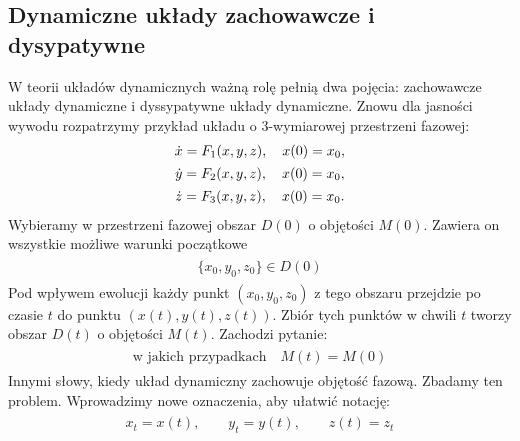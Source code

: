 \documentclass[a4paper,12pt,polish]{sphinxmanual}
\begin{document}
\subsection{Dynamiczne układy zachowawcze i dysypatywne}
\label{ch1/chI022:id1}
W teorii układów dynamicznych ważną rolę pełnią dwa pojęcia: zachowawcze układy dynamiczne i dyssypatywne układy dynamiczne.  Znowu dla jasności wywodu rozpatrzymy przykład układu o 3-wymiarowej przestrzeni fazowej:
\label{ch1/chI022:equation-eqn19}\begin{gather}
\begin{split}\dot x = F_1(x, y, z), \quad x(0) = x_0,\end{split}\label{ch1/chI022-eqn19}\\\begin{split}\dot y = F_2(x, y, z),  \quad x(0) = x_0,\end{split}\notag\\\begin{split}\dot z = F_3(x, y, z),  \quad x(0) = x_0.\end{split}\notag
\end{gather}
Wybieramy w przestrzeni fazowej obszar $D(0)$  o objętości $M(0)$. Zawiera on wszystkie możliwe warunki początkowe
\label{ch1/chI022:equation-eqn20}\begin{gather}
\begin{split}\{x_0, y_0, z_0\} \in D(0)\end{split}\label{ch1/chI022-eqn20}
\end{gather}
Pod wpływem ewolucji każdy punkt $(x_0, y_0, z_0)$  z tego obszaru przejdzie po czasie $t$ do punktu $(x(t),  y(t), z(t))$.  Zbiór tych punktów w chwili $t$ tworzy obszar  $D(t)$  o objętości $M(t)$. Zachodzi pytanie:
\label{ch1/chI022:equation-eqn21}\begin{gather}
\begin{split} \mbox{w jakich przypadkach} \quad M(t) = M(0)\end{split}\label{ch1/chI022-eqn21}
\end{gather}
Innymi słowy, kiedy układ dynamiczny zachowuje objętość fazową. Zbadamy ten problem. Wprowadzimy nowe oznaczenia, aby ułatwić notację:
\label{ch1/chI022:equation-eqn22}\begin{gather}
\begin{split}x_t = x(t), \qquad y_t = y(t), \qquad z(t) = z_t\end{split}\label{ch1/chI022-eqn22}
\end{gather}
\end{document}
